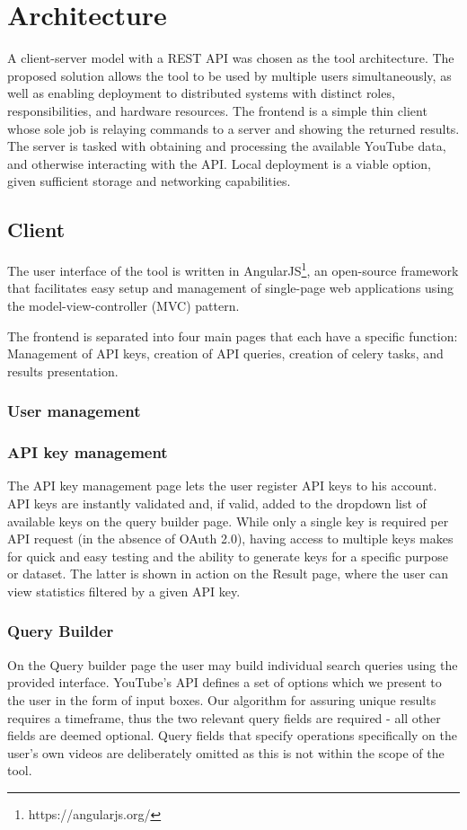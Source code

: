 \section{Architecture}
A client-server model with a REST API was chosen as the tool architecture. The
proposed solution allows the tool to be used by multiple users simultaneously,
as well as enabling deployment to distributed systems with distinct roles,
responsibilities, and hardware resources.
The frontend is a simple thin client whose sole job is relaying commands to a
server and showing the returned results. The server is tasked with obtaining
and processing the available YouTube data, and otherwise interacting with the
API.
Local deployment is a viable option, given sufficient storage and networking
capabilities.


\subsection{Client}
The user interface of the tool is written in
AngularJS\footnote{https://angularjs.org/}, an open-source framework that
facilitates easy setup and management of single-page web applications using the
model-view-controller (MVC) pattern.

The frontend is separated into four main pages that each have a specific
function: Management of API keys, creation of API queries, creation of celery
tasks, and results presentation.


\subsubsection{User management}


\subsubsection{API key management}
The API key management page lets the user register API keys to his account.
API keys are instantly validated and, if valid, added to the dropdown list of
available keys on the query builder page.
While only a single key is required per API request (in the absence of OAuth
2.0), having access to multiple keys makes for quick and easy testing and the
ability to generate keys for a specific purpose or dataset. The latter is
shown in action on the Result page, where the user can view statistics filtered
by a given API key. %


\subsubsection{Query Builder}
On the Query builder page the user may build individual search queries using
the provided interface. YouTube's API defines a set of options which we present
to the user in the form of input boxes. Our algorithm for assuring unique
results requires a timeframe, thus the two relevant query fields are required - 
all other fields are deemed optional. Query fields that specify operations
specifically on the user's own videos are deliberately omitted as this is
not within the scope of the tool.

